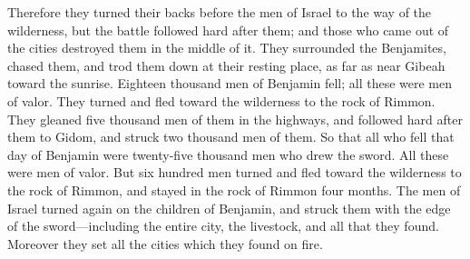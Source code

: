 {Therefore they turned their backs before the men of Israel to the way of the wilderness, but the battle followed hard after them; and those who came out of the cities destroyed them in the middle of it.
They surrounded the Benjamites, chased them, and trod them down at their resting place, as far as near Gibeah toward the sunrise.
Eighteen thousand men of Benjamin fell; all these were men of valor.
They turned and fled toward the wilderness to the rock of Rimmon. They gleaned five thousand men of them in the highways, and followed hard after them to Gidom, and struck two thousand men of them.
So that all who fell that day of Benjamin were twenty-five thousand men who drew the sword. All these were men of valor.
But six hundred men turned and fled toward the wilderness to the rock of Rimmon, and stayed in the rock of Rimmon four months.
The men of Israel turned again on the children of Benjamin, and struck them with the edge of the sword—including the entire city, the livestock, and all that they found. Moreover they set all the cities which they found on fire.

}
